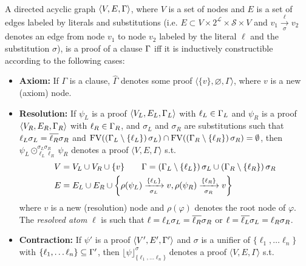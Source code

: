 \documentclass{llncs}
\newcommand{\freevar}[1]{\mathrm{FV}(#1)}
\newcommand{\axiom}[1]{\widehat{#1}}
\newcommand{\n}{v}
\newcommand{\raiz}[1]{\rho(#1)}
\newcommand{\con}[3]{\lfloor #1 \rfloor_{#2}^{#3}}
\newcommand{\res}[4]{\mathrel{\operatorname*{\odot}_{#1 #3}^{#2 #4}}}
\begin{document}
\begin{definition} 
\label{def:proof} \hfill \\
A directed acyclic graph $\langle V, E, \Gamma \rangle$, where $V$ is a set of nodes and $E$ is a
set of edges labeled by literals and substitutions (i.e. $E \subset V \times 2^{\mathcal{L}} \times \mathcal{S} \times V$ and $\n_1
\xrightarrow[\sigma]{\ell} \n_2$ denotes an edge from node $\n_1$ to node $\n_2$ labeled by the literal $\ell$ and the substitution $\sigma$), is a
proof of a clause $\Gamma$ iff it is inductively constructible according to the following cases:

\begin{itemize}
  \item \textbf{Axiom:} If $\Gamma$ is a clause, $\axiom{\Gamma}$ denotes some proof $\langle \{ \n \}, \varnothing,
    \Gamma \rangle$, where $\n$ is a new (axiom) node.
  \item \textbf{Resolution:} If $\psi_L$ is a proof $\langle V_L, E_L, \Gamma_L \rangle$ with $\ell_L \in \Gamma_L$ and
    $\psi_R$ is a proof $\langle V_R, E_R, \Gamma_R \rangle$ with $\ell_R \in \Gamma_R$, and 
    $\sigma_L$ and $\sigma_R$ are substitutions such that
    $\ell_L \sigma_L = \overline{\ell_R} \sigma_R$ and
    $\freevar{\left( \clause_L \setminus \left\{ \ell_L \right\} \right) \sigma_L} \cap 
     \freevar{\left( \clause_R
                    \setminus \left\{ \ell_R \right\} \right) \sigma_R} = \emptyset$, 
    then
    $\psi_L \res{\ell_L}{\sigma_L}{\ell_R}{\sigma_R} \psi_R$ denotes a proof $\langle V, E, \Gamma \rangle$ s.t.
    \begin{align*}
      V &= V_L \cup V_R \cup \{\n \} \qquad
      \Gamma = \left( \clause_L \setminus \left\{ \ell_L \right\} \right) \sigma_L \cup \left( \clause_R
                    \setminus \left\{ \ell_R \right\} \right) \sigma_R  \\
      E &= E_L \cup E_R \cup
                    \left\{ \raiz{\psi_L} \xrightarrow[\sigma_L]{\{\ell_L\} } \n, 
                            \raiz{\psi_R} \xrightarrow[\sigma_R]{\{\ell_R\} } \n \right\}
    \end{align*}
    where $\n$ is a new (resolution) node and $\raiz{\varphi}$ denotes the root node of $\varphi$. The \emph{resolved atom} $\ell$ is such that $\ell = \ell_L \sigma_L = \overline{\ell_R} \sigma_R$ or $\ell = \overline{\ell_L} \sigma_L = \ell_R \sigma_R$.
  \item \textbf{Contraction:} If $\psi'$ is a proof $\langle V', E', \Gamma' \rangle$ and $\sigma$ is a unifier of $\{\ell_1, \ldots \ell_n\}$ with $\{\ell_1, \ldots \ell_n\} \subseteq \Gamma'$, then $\con{\psi}{\{\ell_1, \ldots \ell_n\}}{\sigma}$ denotes a proof $\langle V, E, \Gamma \rangle$ s.t.

\end{itemize}
\end{definition}
\end{document}
